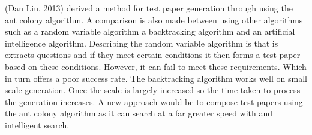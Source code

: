 (Dan Liu, 2013) derived a method for test paper generation through using the ant colony algorithm. A comparison is also made between using other algorithms such as a random variable algorithm a backtracking algorithm and an artificial intelligence algorithm. Describing the random variable algorithm is that is extracts questions and if they meet certain conditions it then forms a test paper based on these conditions. However, it can fail to meet these requirements. Which in turn offers a poor success rate. The backtracking algorithm works well on small scale generation. Once the scale is largely increased so the time taken to process the generation increases. A new approach would be to compose test papers using the ant colony algorithm as it can search at a far greater speed with and intelligent search.
